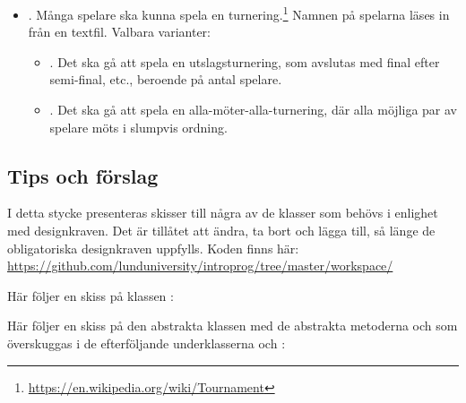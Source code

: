 \begin{itemize}[nosep, label={$\square$}]
\item \textbf{}. Många spelare ska kunna spela en turnering.\footnote{\url{https://en.wikipedia.org/wiki/Tournament}} Namnen på spelarna läses in från en textfil. Valbara varianter:

\begin{itemize}[nosep, label={$\square$}]
\item \textbf{}. Det ska gå att spela en utslagsturnering, som avslutas med final efter semi-final, etc., beroende på antal spelare.
\item \textbf{}. Det ska gå att spela en alla-möter-alla-turnering, där alla möjliga par av spelare möts i slumpvis ordning.
\end{itemize}

\end{itemize}


\subsection{Tips och förslag}\label{lab:snake:tips}

I detta stycke presenteras skisser till några av de klasser som behövs i enlighet med designkraven. Det är tillåtet att ändra, ta bort och lägga till, så länge de obligatoriska designkraven uppfylls. Koden finns här: \\
\url{https://github.com/lunduniversity/introprog/tree/master/workspace/}




Här följer en skiss på klassen :


Här följer en skiss på den abstrakta klassen  med de abstrakta metoderna  och  som överskuggas i de efterföljande underklasserna  och :

